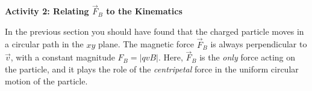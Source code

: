 

\textbf{Activity 2: Relating $\vec F_B$ to the Kinematics}

In the previous section you should have found that the charged particle moves in a circular path in the $xy$ plane.  The magnetic force $\vec F_B$ is always perpendicular to $\vec v$,  with a constant magnitude $F_B = |qvB|$.  Here, $\vec F_B$ is the \textit{only} force acting on the particle, and it plays the role of the \textit{centripetal} force in the uniform circular motion of the particle.

